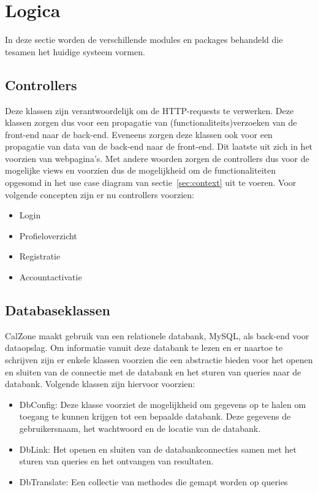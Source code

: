\section{Logica}
\label{sec:logica}

In deze sectie worden de verschillende modules en packages behandeld die tesamen het huidige systeem vormen.

\subsection{Controllers}
\label{subsec:controllers}

Deze klassen zijn verantwoordelijk om de HTTP-requests te verwerken. 
Deze klassen zorgen dus voor een propagatie van (functionaliteits)verzoeken van de front-end naar de back-end. 
Eveneens zorgen deze klassen ook voor een propagatie van data van de back-end naar de front-end. 
Dit laatste uit zich in het voorzien van webpagina's.
Met andere woorden zorgen de controllers dus voor de mogelijke views en voorzien dus de mogelijkheid om de functionaliteiten opgesomd in het use case diagram van sectie~\ref{sec:context} uit te voeren. 
Voor volgende concepten zijn er nu controllers voorzien:

\begin{itemize}
	\item Login
	\item Profieloverzicht
	\item Registratie
	\item Accountactivatie
\end{itemize}

\subsection{Databaseklassen}
\label{subsec:databaseklassen}

CalZone maakt gebruik van een relationele databank, MySQL, als back-end voor dataopslag. 
Om informatie vanuit deze databank te lezen en er naartoe te schrijven zijn er enkele klassen voorzien die een abstractie bieden voor het openen en sluiten van de connectie met de databank en het sturen van queries naar de databank. 
Volgende klassen zijn hiervoor voorzien:

\begin{itemize}
	\item DbConfig: Deze klasse voorziet de mogelijkheid om gegevens op te halen om toegang te kunnen krijgen tot een bepaalde databank. 
	Deze gegevens de gebruikersnaam, het wachtwoord en de locatie van de databank. 
	\item DbLink: Het openen en sluiten van de databankconnecties samen met het sturen van queries en het ontvangen van resultaten.
	\item DbTranslate: Een collectie van methodes die gemapt worden op queries
\end{itemize} 

